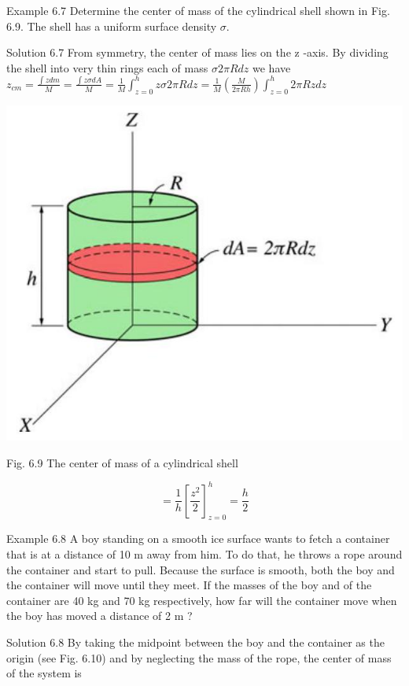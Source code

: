 \documentclass[10pt]{article}
\begin{document}
Example 6.7 Determine the center of mass of the cylindrical shell shown in Fig. 6.9. The shell has a uniform surface density $\sigma$.

Solution 6.7 From symmetry, the center of mass lies on the z -axis. By dividing the shell into very thin rings each of mass $\sigma 2 \pi R d z$ we have\\
$z_{c m}=\frac{\int z d m}{M}=\frac{\int z \sigma d A}{M}=\frac{1}{M} \int_{z=0}^{h} z \sigma 2 \pi R d z=\frac{1}{M}\left(\frac{M}{2 \pi R h}\right) \int_{z=0}^{h} 2 \pi R z d z$

\begin{center}
\includegraphics[max width=\textwidth]{2024_09_13_db1f357d2aad0a03eb2eg-099(2)}
\end{center}

Fig. 6.9 The center of mass of a cylindrical shell

$$
=\frac{1}{h}\left[\frac{z^{2}}{2}\right]_{z=0}^{h}=\frac{h}{2}
$$

Example 6.8 A boy standing on a smooth ice surface wants to fetch a container that is at a distance of 10 m away from him. To do that, he throws a rope around the container and start to pull. Because the surface is smooth, both the boy and the container will move until they meet. If the masses of the boy and of the container are 40 kg and 70 kg respectively, how far will the container move when the boy has moved a distance of 2 m ?

Solution 6.8 By taking the midpoint between the boy and the container as the origin (see Fig. 6.10) and by neglecting the mass of the rope, the center of mass of the system is
\end{document}
